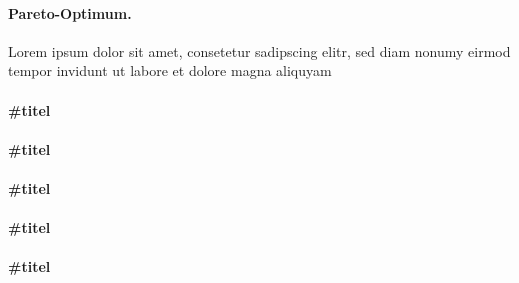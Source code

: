 \documentclass[12pt,twoside]{article}
\theoremstyle{plain}
\theoremstyle{definition}
\theoremstyle{remark}
\begin{document}
\paragraph*{Pareto-Optimum.}
	\label{def:pareto}
	Lorem ipsum dolor sit amet, consetetur sadipscing elitr, sed diam nonumy eirmod tempor invidunt ut labore et dolore magna aliquyam
\paragraph*{\#titel}
	\label{def:todo1}
	\lipsum[2]
\paragraph*{\#titel}
	\label{def:todo2}
	\lipsum[2]
\paragraph*{\#titel}
	\label{def:todo3}
	\lipsum[2]
\paragraph*{\#titel}
	\label{def:todo4}
	\lipsum[2]
\paragraph*{\#titel}
	\label{def:todo5}
	\lipsum[2]


\nocite{*}
\end{document}
